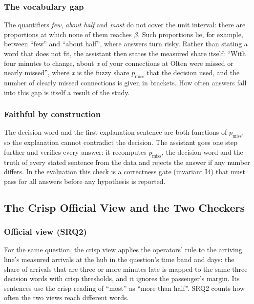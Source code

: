 \subsubsection*{The vocabulary gap} The quantifiers \emph{few}, \emph{about half} and
\emph{most} do not cover the unit interval: there are proportions at which none of them
reaches $\beta$. Such proportions lie, for example, between ``few'' and ``about half'', where
answers turn risky. Rather than stating a word that does not fit, the assistant then states
the measured share itself: ``With four minutes to change, about \emph{x} of your
connections at Olten were missed or nearly missed'', where \emph{x} is the fuzzy share
$p_{\text{miss}}$ that the decision used, and the number of clearly missed connections is
given in brackets. How often answers fall into this gap is itself a result of the study.

\subsubsection*{Faithful by construction} The decision word and the first explanation sentence
are both functions of $p_{\text{miss}}$, so the explanation cannot contradict the decision.
The assistant goes one step further and verifies every answer: it recomputes
$p_{\text{miss}}$, the decision word and the truth of every stated sentence from the data and
rejects the answer if any number differs. In the evaluation this check is a correctness gate
(invariant I4) that must pass for all answers before any hypothesis is reported.

\subsection{The Crisp Official View and the Two Checkers}
\label{sec:crisp}
\subsubsection*{Official view (SRQ2)} For the same question, the crisp view applies the
operators' rule to the arriving line's measured arrivals at the hub in the question's time
band and days: the share of arrivals that are three or more minutes late is mapped to the
same three decision words with crisp thresholds, and it ignores the passenger's margin. Its
sentences use the crisp reading of ``most'' as ``more than half''. SRQ2 counts how often the
two views reach different words.

